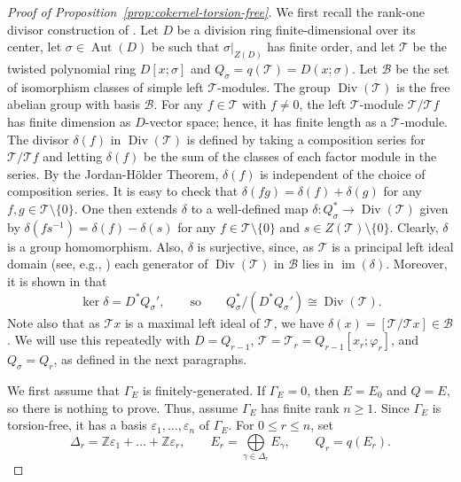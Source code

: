 \documentclass[11pt]{article}
\numberwithin{equation}{section}
\theoremstyle{plain}
\theoremstyle{remark}
\newcommand{\opn}{\operatorname}
\newcommand{\zz}{\mathbb Z}
\newcommand{\scT}{\mathcal T}
\begin{document}
\begin{proof}[Proof of Proposition~\ref{prop:cokernel-torsion-free}]
We first recall the rank-one divisor construction of \cite[Rem.~5.1 and Prop.~5.3]{hazrat-wadsworth-2011}. Let $D$ be 
a division ring finite-dimensional over its center, let $\sigma\in\opn{Aut}(D)$ be such that $\sigma|_{Z(D)}$ has finite 
order, and let 
$\mathcal T$ be the twisted polynomial ring $D[x;\sigma]$ and $Q_\sigma = q(\mathcal T)=D(x;\sigma)$. 
Let $\mathcal B$ be the set of isomorphism classes of simple left $\mathcal T$-modules.
The group $\opn{Div}(\mathcal T)$ is the free abelian group with basis $\mathcal B$. For any $f \in \mathcal T$ with 
$f \ne 0$, the left $\scT$-module 
$\scT/\scT f$ has  finite dimension as  $D$-vector space; hence, it has finite length as a $\scT$-module.
The divisor $\delta(f)$ in $\opn{Div}(\scT)$ is defined by taking a composition series for $\scT/\scT f$ 
and letting $\delta(f)$ be the sum of the classes of each  factor module in the series.  By the Jordan-H\" older Theorem, 
$\delta(f)$ is independent of the choice of  composition series.  It is easy to check that $\delta(fg) = \delta(f) + \delta(g)$ 
for any $f,g\in \scT \setminus\{0\}$.  
One then extends $\delta$ to a well-defined map  $\delta\colon Q_\sigma^*\to\opn{Div}(\scT)$ given by 
$\delta(fs^{-1})=\delta(f)-\delta(s)$ for any  $f\in\mathcal T\setminus\{0\}$ and $s\in Z(\mathcal T)\setminus\{0\}$.
Clearly, $\delta$ is a group homomorphism.  Also, $\delta$ is surjective, since, as $\scT$ is a principal left ideal domain
(see, e.g., \cite[p.~3]{jacobson-1996})
each generator of $\opn{Div}(\scT)$ in $\mathcal B$ lies in $\opn{im}(\delta)$.  
Moreover, it is shown in \cite[Prop.~5.3]{hazrat-wadsworth-2011} that 
$$
        \ker\delta=D^*Q_\sigma',
        \qquad\text{so}\qquad
        Q_\sigma^*/(D^*Q_\sigma')\cong\opn{Div}(\mathcal T).
$$
Note also that as $\scT x$ is a maximal left ideal of $\scT$, we have 
$\delta(x) = [\scT/\scT x]\in \mathcal B$.
We will use this repeatedly with $D=Q_{r-1}$, $\mathcal T=\mathcal T_r=Q_{r-1}[x_r;\varphi_r]$, and $Q_\sigma=Q_r$, as 
defined in the next paragraphs.


We first assume  that $\Gamma_E$ is finitely-generated. If $\Gamma_E=0$, then $E=E_0$ and $Q=E$, so there is 
nothing to prove. Thus, assume $\Gamma_E$ has finite rank $n\ge 1$. Since $\Gamma_E$ is torsion-free, it has a basis 
$\varepsilon_1,\ldots,\varepsilon_n$ of $\Gamma_E$. For $0\leq r\leq n$, set
\begin{equation*}
        \Delta_r=\zz\varepsilon_1+\ldots+\zz\varepsilon_r,\qquad
        E_r=\underset{\gamma\in\Delta_r}{\textstyle{\bigoplus}}E_\gamma,
        \qquad
        Q_r=q(E_r).
\end{equation*}


\end{proof}
\end{document}
